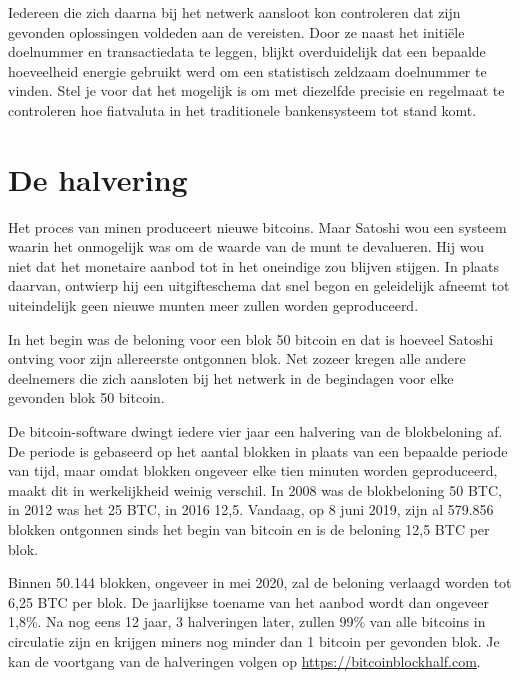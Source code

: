 Iedereen die zich daarna bij het netwerk aansloot kon controleren dat zijn gevonden oplossingen voldeden aan de vereisten. Door ze naast het initiële doelnummer en transactiedata te leggen, blijkt overduidelijk dat een bepaalde hoeveelheid energie gebruikt werd om een statistisch zeldzaam doelnummer te vinden. Stel je voor dat het mogelijk is om met diezelfde precisie en regelmaat te controleren hoe fiatvaluta in het traditionele bankensysteem tot stand komt.

\section{De halvering}
Het proces van minen produceert nieuwe bitcoins. Maar Satoshi wou een systeem waarin het onmogelijk was om de waarde van de munt te devalueren. Hij wou niet dat het monetaire aanbod tot in het oneindige zou blijven stijgen. In plaats daarvan, ontwierp hij een uitgifteschema dat snel begon en geleidelijk afneemt tot uiteindelijk geen nieuwe munten meer zullen worden geproduceerd.

In het begin was de beloning voor een blok 50 bitcoin en dat is hoeveel Satoshi ontving voor zijn allereerste ontgonnen blok. Net zozeer kregen alle andere deelnemers die zich aansloten bij het netwerk in de begindagen voor elke gevonden blok 50 bitcoin.

De bitcoin-software dwingt iedere vier jaar een halvering van de blokbeloning af. De periode is gebaseerd op het aantal blokken in plaats van een bepaalde periode van tijd, maar omdat blokken ongeveer elke tien minuten worden geproduceerd, maakt dit in werkelijkheid weinig verschil. In 2008 was de blokbeloning 50 BTC, in 2012 was het 25 BTC, in 2016 12,5. Vandaag, op 8 juni 2019, zijn al 579.856 blokken ontgonnen sinds het begin van bitcoin en is de beloning 12,5 BTC per blok.

Binnen 50.144 blokken, ongeveer in mei 2020, zal de beloning verlaagd worden tot 6,25 BTC per blok. De jaarlijkse toename van het aanbod wordt dan ongeveer 1,8\%. Na nog eens 12 jaar, 3 halveringen later, zullen 99\% van alle bitcoins in circulatie zijn en krijgen miners nog minder dan 1 bitcoin per gevonden blok. Je kan de voortgang van de halveringen volgen op \href{https://bitcoinblockhalf.com}{https://bitcoinblockhalf.com}.

